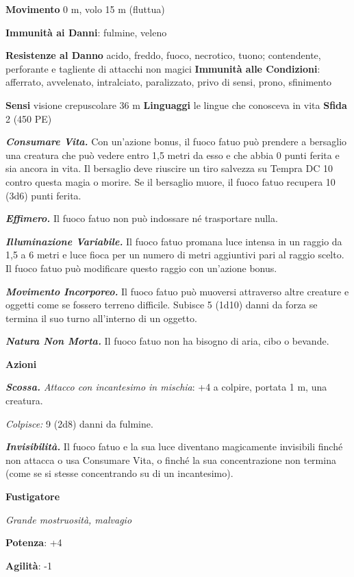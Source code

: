 \begin{multicols}{2}
\textbf{Movimento} 0 m, volo 15 m (fluttua)

\textbf{Immunità ai Danni}: fulmine, veleno

\textbf{Resistenze al Danno} acido, freddo, fuoco, necrotico, tuono;
contendente, perforante e tagliente di attacchi non magici
\textbf{Immunità alle Condizioni}: afferrato, avvelenato, intralciato,
paralizzato, privo di sensi, prono, sfinimento

\textbf{Sensi} visione crepuscolare 36 m
\textbf{Linguaggi} le lingue che conosceva in vita \textbf{Sfida} 2 (450
PE)\smallskip

\emph{\textbf{Consumare Vita.}} Con un'azione bonus, il fuoco fatuo può
prendere a bersaglio una creatura che può vedere entro 1,5 metri da esso
e che abbia 0 punti ferita e sia ancora in vita. Il bersaglio deve
riuscire un tiro salvezza su Tempra DC 10 contro questa magia o
morire. Se il bersaglio muore, il fuoco fatuo recupera 10 (3d6) punti
ferita.

\emph{\textbf{Effimero.}} Il fuoco fatuo non può indossare né
trasportare nulla.

\emph{\textbf{Illuminazione Variabile.}} Il fuoco fatuo promana luce
intensa in un raggio da 1,5 a 6 metri e luce fioca per un numero di
metri aggiuntivi pari al raggio scelto. Il fuoco fatuo può modificare
questo raggio con un'azione bonus.

\emph{\textbf{Movimento Incorporeo.}} Il fuoco fatuo può muoversi
attraverso altre creature e oggetti come se fossero terreno difficile.
Subisce 5 (1d10) danni da forza se termina il suo turno all'interno di
un oggetto.

\emph{\textbf{Natura Non Morta.}} Il fuoco fatuo non ha bisogno di aria,
cibo o bevande.

\smallskip\textbf{Azioni}

\emph{\textbf{Scossa.} Attacco con incantesimo in mischia}: +4 a
colpire, portata 1 m, una creatura.

\emph{Colpisce:} 9 (2d8) danni da fulmine.

\emph{\textbf{Invisibilità.}} Il fuoco fatuo e la sua luce diventano
magicamente invisibili finché non attacca o usa Consumare Vita, o finché
la sua concentrazione non termina (come se si stesse concentrando su di
un incantesimo).

\textbf{Fustigatore}

\emph{Grande mostruosità, malvagio}

\textbf{Potenza}: +4

\textbf{Agilità}: -1


\end{multicols}
